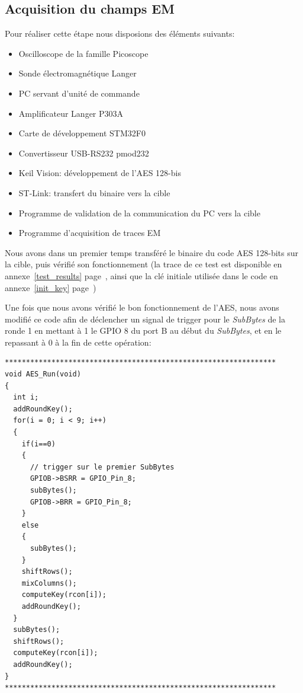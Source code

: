 \documentclass[a4paper, 12pt]{article}
\begin{document}
	\subsection{Acquisition du champs EM}
	Pour réaliser cette étape nous disposions des éléments suivants:
	\begin{itemize}
		\item Oscilloscope de la famille Picoscope
		\item Sonde électromagnétique Langer
		\item PC servant d'unité de commande
		\item Amplificateur Langer P303A
		\item Carte de développement STM32F0
		\item Convertisseur USB-RS232 pmod232
		\item Keil Vision: développement de l'AES 128-bis
		\item ST-Link: transfert du binaire vers la cible
		\item Programme de validation de la communication du PC vers la cible
		\item Programme d'acquisition de traces EM
	\end{itemize}
	
	Nous avons dans un premier temps transféré le binaire du code AES 128-bits sur la cible, puis vérifié son fonctionnement (la trace de ce test est disponible en annexe~\ref{test_results} page~\pageref{test_results}, ainsi que la clé initiale utilisée dans le code en annexe~\ref{init_key} page~\pageref{init_key})

Une fois que nous avons vérifié le bon fonctionnement de l'AES, nous avons modifié ce code afin de déclencher un signal de trigger pour le \emph{SubBytes} de la ronde 1 en mettant à 1 le GPIO 8 du port B au début du \emph{SubBytes}, et en le repassant à 0 à la fin de cette opération:
\begin{lstlisting}
****************************************************************
void AES_Run(void)
{
  int i;
  addRoundKey();
  for(i = 0; i < 9; i++)
  {
    if(i==0)
    {
      // trigger sur le premier SubBytes
      GPIOB->BSRR = GPIO_Pin_8;
      subBytes();
      GPIOB->BRR = GPIO_Pin_8;
    }
    else
    {
      subBytes();		
    }
    shiftRows();
    mixColumns();
    computeKey(rcon[i]);
    addRoundKey();
  }
  subBytes();
  shiftRows();
  computeKey(rcon[i]);
  addRoundKey();
}
****************************************************************
\end{lstlisting}
\end{document}
